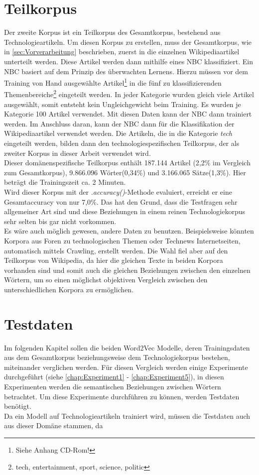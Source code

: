 \documentclass[12pt,a4paper]{report}
\begin{document}
	\section{Teilkorpus}
	\label{sec:Teilkorpus}	
	Der zweite Korpus ist ein Teilkorpus des Gesamtkorpus, bestehend aus Technologieartikeln. Um diesen Korpus zu erstellen, muss der Gesamtkorpus, wie in \ref{sec:Vorverarbeitung} beschrieben, zuerst in die einzelnen Wikipediaartikel unterteilt werden. Diese Artikel werden dann mithilfe eines NBC klassifiziert. Ein NBC basiert auf dem Prinzip des überwachten Lernens. Hierzu müssen vor dem Training von Hand ausgewählte Artikel\footnote{Siehe Anhang CD-Rom!} in die fünf zu klassifizierenden Themenbereiche\footnote{tech, entertainment, sport, science, politic} eingeteilt werden. In jeder Kategorie wurden gleich viele Artikel ausgewählt, somit entsteht kein Ungleichgewicht beim Training. Es wurden je Kategorie 100 Artikel verwendet. Mit diesen Daten kann der NBC dann trainiert werden. Im Anschluss daran, kann der NBC dann für die Klassifikation der Wikipediaartikel verwendet werden. Die Artikeln, die in die Kategorie \textit{tech} eingeteilt werden, bilden dann den technologiespezifischen Teilkorpus, der als zweiter Korpus in dieser Arbeit verwendet wird.\\
	
	
	Dieser domänenspezifische Teilkorpus enthält 187.144 Artikel (2,2\% im Vergleich zum Gesamtkorpus), 9.866.096 Wörter(0,34\%) und 3.166.065 Sätze(1,3\%). Hier beträgt die Trainingszeit ca. 2 Minuten.\\
	Wird dieser Korpus mit der \textit{.accuracy()}-Methode evaluiert, erreicht er eine Gesamtaccuracy von nur 7,0\%. Das hat den Grund, dass die Testfragen sehr allgemeiner Art sind und diese Beziehungen in einem reinen Technologiekorpus sehr selten bis gar nicht vorkommen.\\
	
	Es wäre auch möglich gewesen, andere Daten zu benutzen. Beispielsweise könnten Korpora aus Foren zu technologischen Themen oder Technews Internetseiten, automatisch mittels Crawling, erstellt werden. Die Wahl fiel aber auf den Teilkorpus von Wikipedia, da hier die gleichen Texte in beiden Korpora vorhanden sind und somit auch die gleichen Beziehungen zwischen den einzelnen Wörtern, um so einen möglichst objektiven Vergleich zwischen den unterschiedlichen Korpora zu ermöglichen.\\
	
	
	\section{Testdaten}
Im folgenden Kapitel sollen die beiden Word2Vec Modelle, deren Trainingsdaten aus dem Gesamtkorpus beziehungsweise dem Technologiekorpus bestehen, miteinander verglichen werden. Für diesen Vergleich werden einige Experimente durchgeführt (siehe \ref{chap:Experiment1} - \ref{chap:Experiment5}), in diesen Experimenten werden die semantischen Beziehungen zwischen Wörtern betrachtet. Um diese Experimente durchführen zu können, werden Testdaten benötigt.\\
Da ein Modell auf Technologieartikeln trainiert wird, müssen die Testdaten auch aus dieser Domäne stammen, da 
\end{document}
